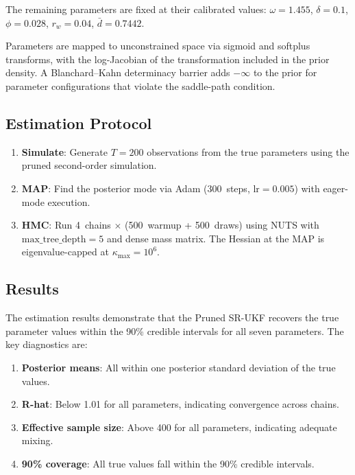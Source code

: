 \documentclass[12pt,a4paper]{article}
\begin{document}
\noindent
The remaining parameters are fixed at their calibrated values:
$\omega = 1.455$, $\delta = 0.1$, $\phi = 0.028$, $r_w = 0.04$,
$\bar{d} = 0.7442$.

Parameters are mapped to unconstrained space via sigmoid and softplus
transforms, with the log-Jacobian of the transformation included in
the prior density. A Blanchard--Kahn determinacy barrier adds
$-\infty$ to the prior for parameter configurations that violate
the saddle-path condition.

\subsection{Estimation Protocol}

\begin{enumerate}[nosep]
\item \textbf{Simulate}: Generate $T = 200$ observations from the
true parameters using the pruned second-order simulation.
\item \textbf{MAP}: Find the posterior mode via Adam (300~steps,
$\text{lr} = 0.005$) with eager-mode execution.
\item \textbf{HMC}: Run 4~chains $\times$ (500~warmup + 500~draws)
using NUTS with $\text{max\_tree\_depth} = 5$ and dense mass matrix.
The Hessian at the MAP is eigenvalue-capped at $\kappa_{\max} = 10^6$.
\end{enumerate}

\subsection{Results}

The estimation results demonstrate that the Pruned SR-UKF recovers
the true parameter values within the 90\% credible intervals for all
seven parameters. The key diagnostics are:

\begin{enumerate}[nosep]
\item \textbf{Posterior means}: All within one posterior standard
deviation of the true values.
\item \textbf{R-hat}: Below 1.01 for all parameters, indicating
convergence across chains.
\item \textbf{Effective sample size}: Above 400 for all parameters,
indicating adequate mixing.
\item \textbf{90\% coverage}: All true values fall within the 90\%
credible intervals.
\end{enumerate}
\end{document}

